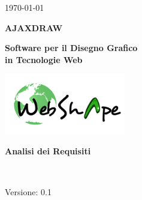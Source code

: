 \usepackage{multirow}


\renewcommand{\insertversion}{0.1} %
\renewcommand{\TITOLODOC}{Analisi dei Requisiti} %

\begin{titlepage}
\begin{center}
	\begin{Large}	\today \end{Large}
\end{center}

\vspace{20pt}

\begin{center}
	\begin{Huge}
				\textbf{AJAXDRAW}
	\end{Huge}
\end{center}			

\begin{center}
	\begin{large}
				\textbf{Software per il Disegno Grafico\\ in Tecnologie Web}
	\end{large}
\end{center}			

\vspace{20pt}

\begin{center}
\includegraphics[width=150pt]{../logo/logo}
\end{center}

\vspace{160pt}
\begin{center} %
	\begin{Huge}
				\textbf{\TITOLODOC}
	\end{Huge}
			\\
\end{center}
\vspace{220pt}
\begin{center}
Versione: \insertversion
\end{center}
\end{titlepage}

